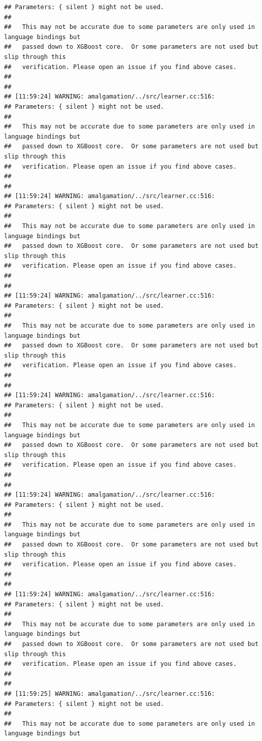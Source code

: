 \documentclass[AMS,STIX2COL]{WileyNJD-v2}\usepackage[]{graphicx}\usepackage[]{color}
\makeatletter
\newenvironment{kframe}{%
 \def\at@end@of@kframe{}%
 \ifinner\ifhmode%
  \def\at@end@of@kframe{\end{minipage}}%
  \begin{minipage}{\columnwidth}%
 \fi\fi%
 \def\FrameCommand##1{\hskip\@totalleftmargin \hskip-\fboxsep
 \colorbox{shadecolor}{##1}\hskip-\fboxsep
     \hskip-\linewidth \hskip-\@totalleftmargin \hskip\columnwidth}%
 \MakeFramed {\advance\hsize-\width
   \@totalleftmargin\z@ \linewidth\hsize
   \@setminipage}}%
 {\par\unskip\endMakeFramed%
 \at@end@of@kframe}
\newenvironment{knitrout}{}{} %
\makeatother
\begin{document}
\begin{knitrout}
\begin{kframe}
\begin{verbatim}
## Parameters: { silent } might not be used.
## 
##   This may not be accurate due to some parameters are only used in language bindings but
##   passed down to XGBoost core.  Or some parameters are not used but slip through this
##   verification. Please open an issue if you find above cases.
## 
## 
## [11:59:24] WARNING: amalgamation/../src/learner.cc:516: 
## Parameters: { silent } might not be used.
## 
##   This may not be accurate due to some parameters are only used in language bindings but
##   passed down to XGBoost core.  Or some parameters are not used but slip through this
##   verification. Please open an issue if you find above cases.
## 
## 
## [11:59:24] WARNING: amalgamation/../src/learner.cc:516: 
## Parameters: { silent } might not be used.
## 
##   This may not be accurate due to some parameters are only used in language bindings but
##   passed down to XGBoost core.  Or some parameters are not used but slip through this
##   verification. Please open an issue if you find above cases.
## 
## 
## [11:59:24] WARNING: amalgamation/../src/learner.cc:516: 
## Parameters: { silent } might not be used.
## 
##   This may not be accurate due to some parameters are only used in language bindings but
##   passed down to XGBoost core.  Or some parameters are not used but slip through this
##   verification. Please open an issue if you find above cases.
## 
## 
## [11:59:24] WARNING: amalgamation/../src/learner.cc:516: 
## Parameters: { silent } might not be used.
## 
##   This may not be accurate due to some parameters are only used in language bindings but
##   passed down to XGBoost core.  Or some parameters are not used but slip through this
##   verification. Please open an issue if you find above cases.
## 
## 
## [11:59:24] WARNING: amalgamation/../src/learner.cc:516: 
## Parameters: { silent } might not be used.
## 
##   This may not be accurate due to some parameters are only used in language bindings but
##   passed down to XGBoost core.  Or some parameters are not used but slip through this
##   verification. Please open an issue if you find above cases.
## 
## 
## [11:59:24] WARNING: amalgamation/../src/learner.cc:516: 
## Parameters: { silent } might not be used.
## 
##   This may not be accurate due to some parameters are only used in language bindings but
##   passed down to XGBoost core.  Or some parameters are not used but slip through this
##   verification. Please open an issue if you find above cases.
## 
## 
## [11:59:25] WARNING: amalgamation/../src/learner.cc:516: 
## Parameters: { silent } might not be used.
## 
##   This may not be accurate due to some parameters are only used in language bindings but

\end{verbatim}
\end{kframe}
\end{knitrout}
\end{document}
